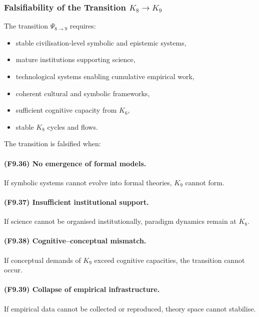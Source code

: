 \subsubsection{Falsifiability of the Transition \texorpdfstring{$K_8 \to K_9$}{K_8 \to K_9}}

The transition $\Psi_{8\to 9}$ requires:

\begin{itemize}
    \item stable civilisation-level symbolic and epistemic systems,
    \item mature institutions supporting science,
    \item technological systems enabling cumulative empirical work,
    \item coherent cultural and symbolic frameworks,
    \item sufficient cognitive capacity from $K_6$,
    \item stable $K_8$ cycles and flows.
\end{itemize}

The transition is falsified when:

\paragraph{(F9.36) No emergence of formal models.}
If symbolic systems cannot evolve into formal theories,
$K_9$ cannot form.

\paragraph{(F9.37) Insufficient institutional support.}
If science cannot be organised institutionally,
paradigm dynamics remain at $K_8$.

\paragraph{(F9.38) Cognitive–conceptual mismatch.}
If conceptual demands of $K_9$ exceed cognitive capacities,
the transition cannot occur.

\paragraph{(F9.39) Collapse of empirical infrastructure.}
If empirical data cannot be collected or reproduced,
theory space cannot stabilise.


